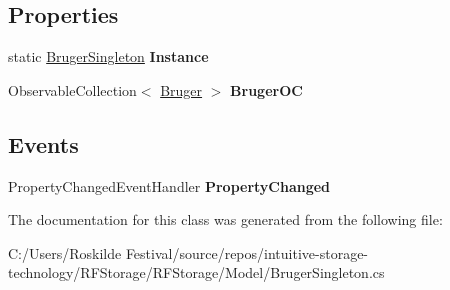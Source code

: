 \subsection*{Properties}
\begin{DoxyCompactItemize}
\item 
\mbox{\label{class_r_f_storage_1_1_model_1_1_bruger_singleton_a433d2f488b22e1e8cf45da3ba2ed39c7}} 
static \mbox{\hyperlink{class_r_f_storage_1_1_model_1_1_bruger_singleton}{Bruger\+Singleton}} {\bfseries Instance}
\item 
\mbox{\label{class_r_f_storage_1_1_model_1_1_bruger_singleton_aaf938004bbed044441731deb68d0a9bb}} 
Observable\+Collection$<$ \mbox{\hyperlink{class_r_f_storage_1_1_model_1_1_bruger}{Bruger}} $>$ {\bfseries Bruger\+OC}
\end{DoxyCompactItemize}
\subsection*{Events}
\begin{DoxyCompactItemize}
\item 
\mbox{\label{class_r_f_storage_1_1_model_1_1_bruger_singleton_a768540634c1ff9e5637a0943024c829a}} 
Property\+Changed\+Event\+Handler {\bfseries Property\+Changed}
\end{DoxyCompactItemize}


The documentation for this class was generated from the following file\+:\begin{DoxyCompactItemize}
\item 
C\+:/\+Users/\+Roskilde Festival/source/repos/intuitive-\/storage-\/technology/\+R\+F\+Storage/\+R\+F\+Storage/\+Model/Bruger\+Singleton.\+cs\end{DoxyCompactItemize}

